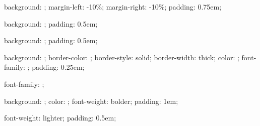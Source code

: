 %
{%
  background: \@getcolor{\sectionbackgroundcolor};
  margin-left: -10\%;
  margin-right: -10\%;
  padding: 0.75em;
}


%
{%
  background: \@getcolor{\subsectionbackgroundcolor};
  padding: 0.5em;
}


%
{%
  background: \@getcolor{\subsubsectionbackgroundcolor};
  padding: 0.5em;
}


%
{%
  background: \@getcolor{\terminalbackgroundcolor};
  border-color: \@getcolor{\terminalbordercolor};
  border-style: solid;
  border-width: thick;
  color: \@getcolor{\terminalcolor};
  font-family: \fixedfontfamily;
  padding: 0.25em;
}


{
  font-family: \sansfontfamily;
}


%
{%
  background: \@getcolor{\titlebackgroundcolor};
  color: \@getcolor{\titleforegroundcolor};
  font-weight: bolder;
  padding: 1em;
}


%
{%
  font-weight: lighter;
  padding: 0.5em;
}


